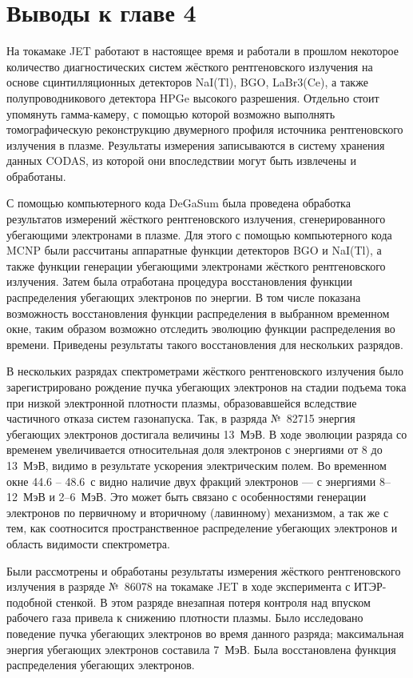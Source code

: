 
\FloatBarrier
\section{Выводы к главе 4}

На токамаке JET работают в настоящее время и работали в прошлом некоторое количество диагностических систем жёсткого рентгеновского излучения на основе сцинтилляционных детекторов NaI(Tl), BGO, LaBr3(Ce), а также полупроводникового детектора HPGe высокого разрешения. Отдельно стоит упомянуть гамма-камеру, с помощью которой возможно выполнять томографическую реконструкцию двумерного профиля источника рентгеновского излучения в плазме. Результаты измерения записываются в систему хранения данных CODAS, из которой они впоследствии могут быть извлечены и обработаны. 

С помощью компьютерного кода DeGaSum была проведена обработка результатов измерений жёсткого рентгеновского излучения, сгенерированного убегающими электронами в плазме. Для этого с помощью компьютерного кода MCNP были рассчитаны аппаратные функции детекторов BGO и NaI(Tl), а также функции генерации убегающими электронами жёсткого рентгеновского излучения. Затем была отработана процедура восстановления функции распределения убегающих электронов по энергии. В том числе показана возможность восстановления функции распределения в выбранном временном окне, таким образом возможно отследить эволюцию функции распределения во времени. Приведены результаты такого восстановления для нескольких разрядов. 

В нескольких разрядах спектрометрами жёсткого рентгеновского излучения было зарегистрировано рождение пучка убегающих электронов на стадии подъема тока при низкой электронной плотности плазмы, образовавшейся вследствие частичного отказа систем газонапуска. Так, в разряда №~82715 энергия убегающих электронов достигала величины 13~МэВ. В ходе эволюции разряда со временем увеличивается относительная доля электронов с энергиями от 8 до 13~МэВ, видимо в результате ускорения электрическим полем. Во временном окне 44.6 -- 48.6~с видно наличие двух фракций электронов --- с энергиями 8--12~МэВ и 2--6~МэВ. Это может быть связано с особенностями генерации электронов по первичному и вторичному (лавинному) механизмом, а так же с тем, как соотносится пространственное распределение убегающих электронов и область видимости спектрометра.  

Были рассмотрены и обработаны результаты измерения жёсткого рентгеновского излучения в разряде №~86078 на токамаке JET в ходе эксперимента с ИТЭР-подобной стенкой. В этом разряде внезапная потеря контроля над впуском рабочего газа привела к снижению плотности плазмы. Было исследовано поведение пучка убегающих электронов во время данного разряда; максимальная энергия убегающих электронов составила 7~МэВ. Была восстановлена функция распределения убегающих электронов.

